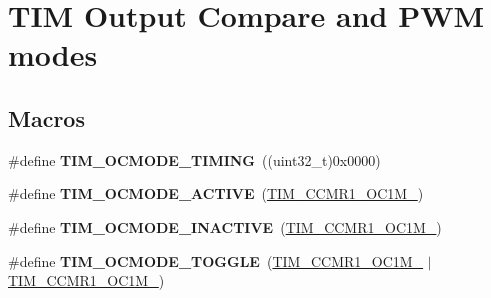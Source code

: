 \hypertarget{group___t_i_m___output___compare__and___p_w_m__modes}{}\section{T\+IM Output Compare and P\+WM modes}
\label{group___t_i_m___output___compare__and___p_w_m__modes}
\subsection*{Macros}
\begin{DoxyCompactItemize}
\item 
\#define {\bfseries T\+I\+M\+\_\+\+O\+C\+M\+O\+D\+E\+\_\+\+T\+I\+M\+I\+NG}~((uint32\+\_\+t)0x0000)\hypertarget{group___t_i_m___output___compare__and___p_w_m__modes_gafae6b98b4b854fbfffd9a5ebc59c8f61}{}\label{group___t_i_m___output___compare__and___p_w_m__modes_gafae6b98b4b854fbfffd9a5ebc59c8f61}

\item 
\#define {\bfseries T\+I\+M\+\_\+\+O\+C\+M\+O\+D\+E\+\_\+\+A\+C\+T\+I\+VE}~(\hyperlink{group___peripheral___registers___bits___definition_ga410a4752a98081bad8ab3f72b28e7c5f}{T\+I\+M\+\_\+\+C\+C\+M\+R1\+\_\+\+O\+C1\+M\+\_})\hypertarget{group___t_i_m___output___compare__and___p_w_m__modes_ga111d1023e3ac6ef5544775c3863b4b12}{}\label{group___t_i_m___output___compare__and___p_w_m__modes_ga111d1023e3ac6ef5544775c3863b4b12}

\item 
\#define {\bfseries T\+I\+M\+\_\+\+O\+C\+M\+O\+D\+E\+\_\+\+I\+N\+A\+C\+T\+I\+VE}~(\hyperlink{group___peripheral___registers___bits___definition_ga8b5f6ec25063483641d6dc065d96d2b5}{T\+I\+M\+\_\+\+C\+C\+M\+R1\+\_\+\+O\+C1\+M\+\_})\hypertarget{group___t_i_m___output___compare__and___p_w_m__modes_ga890fbb44fd16f2bce962983352d23f53}{}\label{group___t_i_m___output___compare__and___p_w_m__modes_ga890fbb44fd16f2bce962983352d23f53}

\item 
\#define {\bfseries T\+I\+M\+\_\+\+O\+C\+M\+O\+D\+E\+\_\+\+T\+O\+G\+G\+LE}~(\hyperlink{group___peripheral___registers___bits___definition_ga410a4752a98081bad8ab3f72b28e7c5f}{T\+I\+M\+\_\+\+C\+C\+M\+R1\+\_\+\+O\+C1\+M\+\_} $\vert$ \hyperlink{group___peripheral___registers___bits___definition_ga8b5f6ec25063483641d6dc065d96d2b5}{T\+I\+M\+\_\+\+C\+C\+M\+R1\+\_\+\+O\+C1\+M\+\_})\hypertarget{group___t_i_m___output___compare__and___p_w_m__modes_ga368f80fad76018e2bf76084522e47536}{}\label{group___t_i_m___output___compare__and___p_w_m__modes_ga368f80fad76018e2bf76084522e47536}


\end{DoxyCompactItemize}
